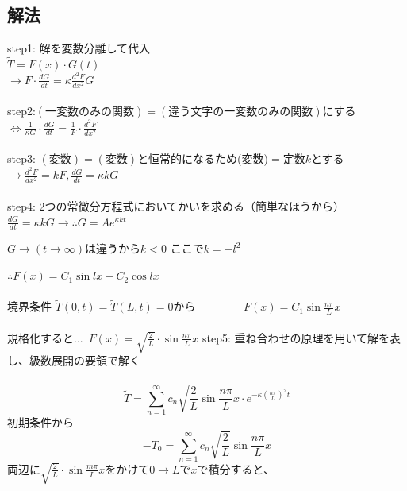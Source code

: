 \documentclass[titlepage,dvipdfmx]{jsarticle}
\begin{document}
\subsection*{解法}
\noindent step1: 解を変数分離して代入\\
$\widetilde{T}= F(x)\cdot G(t)$\\
$\displaystyle \rightarrow F \cdot \frac{d G}{dt}=\kappa \frac{d^2 F}{d x^2}G$\\\\
step2:$(一変数のみの関数)=(違う文字の一変数のみの関数)$にする\\
$\displaystyle \Leftrightarrow \frac{1}{\kappa G}\cdot \frac{d G}{dt}= \frac{1}{F}\cdot \frac{d^2 F}{dx^2}$\\\\
step3: $(変数)=(変数)$と恒常的になるため(変数)$=$定数$k$とする\\
$\displaystyle \rightarrow \frac{d^2 F}{dx^2}=kF , \frac{dG}{dt}=\kappa k G$\\\\
step4: 2つの常微分方程式においてかいを求める（簡単なほうから）
$\displaystyle \frac{dG}{dt} =\kappa k G \rightarrow \therefore G =Ae^{\kappa k t}$\\
\begin{center}
$G\rightarrow (t\rightarrow \infty)は違うからk<0$ ここで$k=-l^2$
\end{center}
$\therefore F(x)=C_1\sin lx +C_2 \cos lx $ \\\\
境界条件 $\widetilde{T}(0,t)=\widetilde{T}(L,t)=0$から~~~~~~~~
$\displaystyle F(x)=C_1 \sin \frac{n\pi}{L}x$\\\\
規格化すると...~$\displaystyle F(x)=\sqrt{\frac{2}{L}}\cdot \sin \frac{n\pi}{L}x$
step5: 重ね合わせの原理を用いて解を表し、級数展開の要領で解く\\\\
\begin{equation}\displaystyle
\widetilde{T}=\sum_{n=1}^{\infty} c_n \sqrt{\frac{2}{L}} \sin \frac{n\pi}{L}x \cdot e^{-\kappa (\frac{n \pi }{L})^2t}
\nonumber
\end{equation}
初期条件から\\
\begin{equation}\displaystyle
-T_0=\sum_{n=1}^{\infty} c_n \sqrt{\frac{2}{L}} \sin \frac{n\pi}{L}x 
\nonumber
\end{equation}
両辺に$\displaystyle \sqrt{\frac{2}{L}}\cdot \sin \frac{m\pi}{L}x$をかけて$0\rightarrow L$で$x$で積分すると、\\
\end{document}
